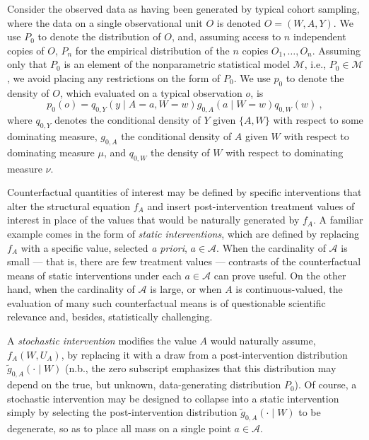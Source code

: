 Consider the observed data as having been generated by typical cohort sampling,
where the data on a single observational unit $O$ is denoted $O = (W, A, Y)$. We
use $P_0$ to denote the distribution of $O$, and, assuming access to $n$
independent copies of $O$, $P_n$ for the empirical distribution of the $n$
copies $O_1, \ldots, O_n$. Assuming only that $P_0$ is an element of the
nonparametric statistical model $\mathcal{M}$, i.e., $P_0 \in \mathcal{M}$, we
avoid placing any restrictions on the form of $P_0$. We use $p_0$ to denote the
density of $O$, which evaluated on a typical observation $o$, is
\begin{equation*}\label{likelihood_factorization}
  p_0(o) = q_{0,Y}(y \mid A = a, W = w) g_{0,A}(a \mid W = w) q_{0,W}(w) \ ,
\end{equation*}
where $q_{0, Y}$ denotes the conditional density of $Y$ given $\{A, W\}$ with
respect to some dominating measure, $g_{0, A}$ the conditional density of $A$
given $W$ with respect to dominating measure $\mu$, and $q_{0, W}$ the density
of $W$ with respect to dominating measure $\nu$.

Counterfactual quantities of interest may be defined by specific interventions
that alter the structural equation $f_A$ and insert post-intervention treatment
values of interest in place of the values that would be naturally generated by
$f_A$. A familiar example comes in the form of \textit{static interventions},
which are defined by replacing $f_A$ with a specific value, selected \textit{a
priori}, $a \in \mathcal{A}$. When the cardinality of $\mathcal{A}$ is small ---
that is, there are few treatment values --- contrasts of the counterfactual
means of static interventions under each $a \in \mathcal{A}$ can prove useful.
On the other hand, when the cardinality of $\mathcal{A}$ is large, or when $A$
is continuous-valued, the evaluation of many such counterfactual means is of
questionable scientific relevance and, besides, statistically challenging.

A \textit{stochastic intervention} modifies the value $A$ would naturally
assume, $f_A(W, U_A)$, by replacing it with a draw from a post-intervention
distribution $\tilde{g}_{0,A}(\cdot \mid W)$ (n.b., the zero subscript
emphasizes that this distribution may depend on the true, but unknown,
data-generating distribution $P_0$). Of course, a stochastic intervention may be
designed to collapse into a static intervention simply by selecting the
post-intervention distribution $\tilde{g}_{0,A}(\cdot \mid W)$ to be degenerate,
so as to place all mass on a single point $a \in \mathcal{A}$.

